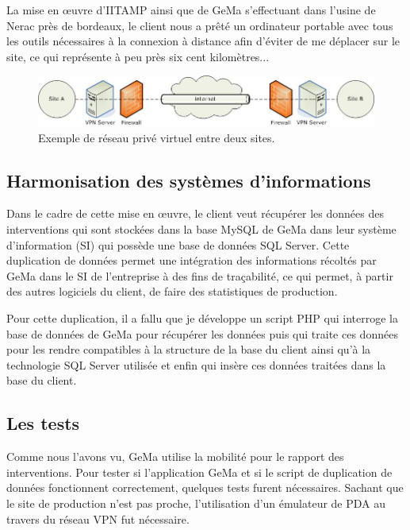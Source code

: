 La mise en \oe{}uvre d'IITAMP ainsi que de GeMa s'effectuant dans
l'usine de Nerac près de bordeaux, le client nous a prêté un ordinateur
portable avec tous les outils nécessaires à la connexion à distance afin
d'éviter de me déplacer sur le site, ce qui représente à peu près six
cent kilomètres...

\begin{figure}
  \begin{center}
    \includegraphics[scale=0.5]{images/vpn.png}
    \caption{Exemple de réseau privé virtuel entre deux sites.}
    \label{vpn}
  \end{center}
\end{figure}

\subsection{Harmonisation des systèmes d'informations} %
\label{sub:Harmonisation des systèmes d'informations}

Dans le cadre de cette mise en \oe{}uvre, le client veut récupérer les
données des interventions qui sont stockées dans la base MySQL de GeMa
dans leur système d'information (SI) qui possède une base de données SQL
Server. Cette duplication de données permet une intégration des
informations récoltés par GeMa dans le SI de l'entreprise à des fins de
traçabilité, ce qui permet, à partir des autres logiciels du client, de
faire des statistiques de production.

Pour cette duplication, il a fallu que je développe un script PHP qui
interroge la base de données de GeMa pour récupérer les données puis qui
traite ces données pour les rendre compatibles à la structure de la base
du client ainsi qu'à la technologie SQL Server utilisée et enfin qui
insère ces données traitées dans la base du client.

\subsection{Les tests} %
\label{sub:Les tests}

Comme nous l'avons vu, GeMa utilise la mobilité pour le rapport des
interventions. Pour tester si l'application GeMa et si le script de
duplication de données fonctionnent correctement, quelques tests furent
nécessaires. Sachant que le site de production n'est pas proche,
l'utilisation d'un émulateur de PDA au travers du réseau VPN fut
nécessaire.

